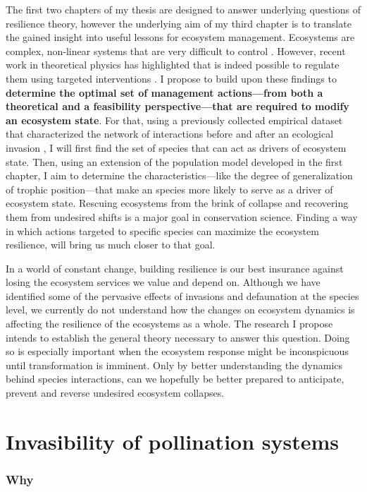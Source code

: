 \documentclass[a4paper]{report}
\begin{document}
The first two chapters of my thesis are designed to answer underlying questions of resilience theory, however the underlying aim of my third chapter is to translate the gained insight into useful lessons for ecosystem management.
Ecosystems are complex, non-linear systems that are very difficult to control .
However, recent work in theoretical physics has highlighted that is indeed possible to regulate them using targeted interventions \citep{Cornelius2013}.
I propose to build upon these findings to \textbf{determine the optimal set of management actions---from both a theoretical and a feasibility perspective---that are required to modify an ecosystem state}.
For that, using a previously collected empirical dataset that characterized the network of interactions before and after an ecological invasion \citep{Bartomeus2008}, I will first find the set of species that can act as drivers of ecosystem state.
Then, using an extension of the population model developed in the first chapter, I aim to determine the characteristics---like the degree of generalization of trophic position---that make an species more likely to serve as a driver of ecosystem state.
Rescuing ecosystems from the brink of collapse and recovering them from undesired shifts is a major goal in conservation science.
Finding a way in which actions targeted to specific species can maximize the ecosystem resilience, will bring us much closer to that goal.

In a world of constant change, building resilience is our best insurance against losing the ecosystem services we value and depend on.
Although we have identified some of the pervasive effects of invasions and defaunation at the species level, we currently do not understand how the changes on ecosystem dynamics is affecting the resilience of the ecosystems as a whole.
The research I propose intends to establish the general theory necessary to answer this question.
Doing so is especially important when the ecosystem response might be inconspicuous until transformation is imminent.
Only by better understanding the dynamics behind species interactions, can we hopefully be better prepared to anticipate, prevent and reverse undesired ecosystem collapses.

\chapter*{Invasibility of pollination systems}

\subsection*{Why}
\end{document}
